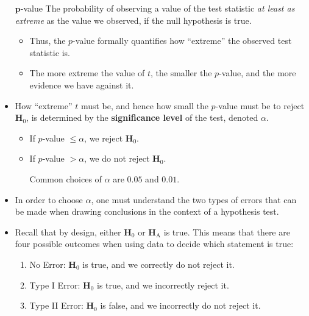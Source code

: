 \begin{itemize}
            \begin{Definition}{$ \symbf{p} $-value}{}
                  The probability of observing a value of the test statistic \emph{at least as extreme}
                  as the value we observed, if the null hypothesis is true.
            \end{Definition}
            \begin{itemize}
                  \item Thus, the $ p $-value formally quantifies how ``extreme'' the observed
                        test statistic is.
                  \item The more extreme the value of $ t $, the smaller the $ p $-value, and the more
                        evidence we have against it.
            \end{itemize}
      \item How ``extreme'' $ t $ must be, and hence how small the $ p $-value must be
            to reject $ \mathbf{H}_0 $, is determined by the \textbf{significance level} of the test,
            denoted $ \alpha $.
            \begin{itemize}
                  \item If $ p $-value $ \le \alpha $, we reject $ \mathbf{H}_0 $.
                  \item If $ p $-value $ >\alpha $, we do not reject $ \mathbf{H}_0 $.
                        \begin{Remark}{}{}
                              Common choices of $ \alpha $ are $ 0.05 $ and $ 0.01 $.
                        \end{Remark}
            \end{itemize}
      \item In order to choose $ \alpha $, one must understand the two types of errors
            that can be made when drawing conclusions in the context of a hypothesis test.
      \item Recall that by design, either $ \mathbf{H}_0 $ or $ \mathbf{H}_\text{A} $ is true.
            This means that there are four possible outcomes when using data to decide which
            statement is true:
            \begin{enumerate}[(1)]
                  \item No Error: $ \mathbf{H}_0 $ is true, and we correctly do not reject it.
                  \item Type I Error: $ \mathbf{H}_0 $ is true, and we incorrectly reject it.
                  \item Type II Error: $ \mathbf{H}_0 $ is false, and we incorrectly do not reject it.

\end{enumerate}
\end{itemize}
